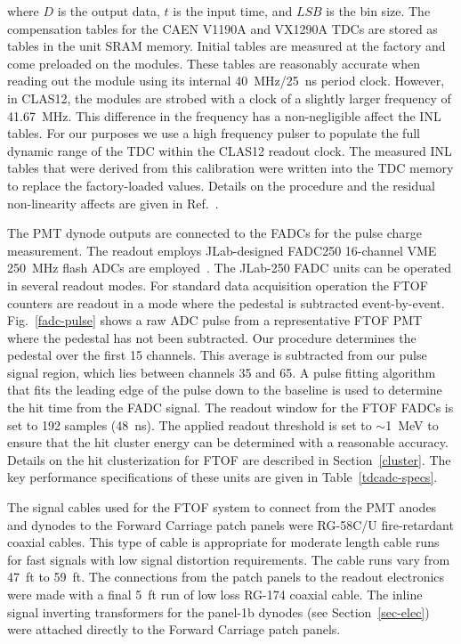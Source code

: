 \documentclass{elsart}
\begin{document}
\noindent
where $D$ is the output data, $t$ is the input time, and $LSB$ is the bin size. The compensation tables
for the CAEN V1190A and VX1290A TDCs are stored as tables in the unit SRAM memory. Initial tables
are measured at the factory and come preloaded on the modules. These tables are reasonably accurate
when reading out the module using its internal 40~MHz/25~ns period clock. However, in CLAS12, the
modules are strobed with a clock of a slightly larger frequency of 41.67~MHz. This difference in the
frequency has a non-negligible affect the INL tables. For our purposes we use a high frequency pulser to
populate the full dynamic range of the TDC within the CLAS12 readout clock. The measured INL tables that
were derived from this calibration were written into the TDC memory to replace the factory-loaded values.
Details on the procedure and the residual non-linearity affects are given in Ref.~\cite{inl-tables}.

The PMT dynode outputs are connected to the FADCs for the pulse charge measurement. The readout
employs JLab-designed FADC250 16-channel VME 250~MHz flash ADCs are employed~\cite{fadc-manual}.
The JLab-250 FADC units can be operated in several readout modes. For standard data acquisition operation
the FTOF counters are readout in a mode where the pedestal is subtracted event-by-event.
Fig.~\ref{fadc-pulse} shows a raw ADC pulse from a representative FTOF PMT where the pedestal has not
been subtracted. Our procedure determines the pedestal over the first 15 channels. This average is
subtracted from our pulse signal region, which lies between channels 35 and 65. A pulse fitting algorithm
that fits the leading edge of the pulse down to the baseline is used to determine the hit time from the
FADC signal. The readout window for the FTOF FADCs is set to 192 samples (48~ns). The applied readout
threshold is set to $\sim$1~MeV to ensure that the hit cluster energy can be determined with a reasonable
accuracy. Details on the hit clusterization for FTOF are described in Section~\ref{cluster}. The key
performance specifications of these units are given in Table~\ref{tdcadc-specs}.

The signal cables used for the FTOF system to connect from the PMT anodes and dynodes to the Forward
Carriage patch panels were RG-58C/U fire-retardant coaxial cables. This type of cable is appropriate for
moderate length cable runs for fast signals with low signal distortion requirements. The cable runs vary
from 47~ft to 59~ft. The connections from the patch panels to the readout electronics were made with a
final 5~ft run of low loss RG-174 coaxial cable. The inline signal inverting transformers for the panel-1b
dynodes (see Section~\ref{sec-elec}) were attached directly to the Forward Carriage patch panels.
\end{document}
